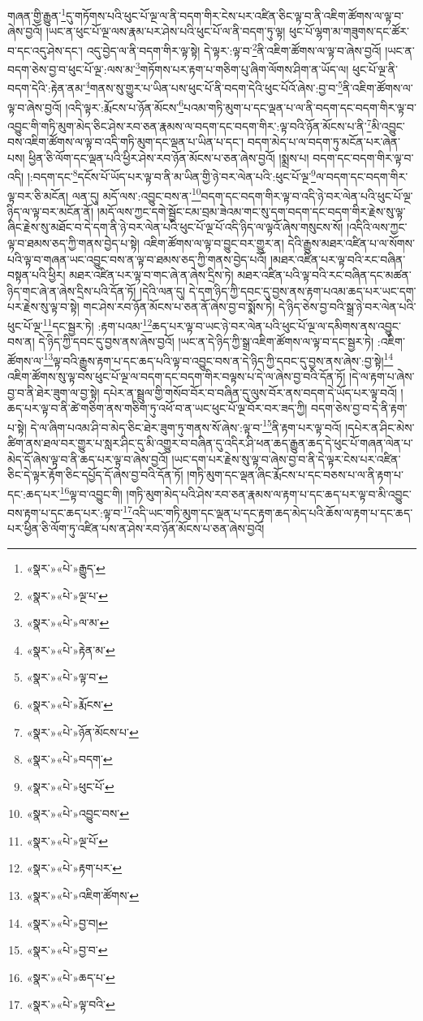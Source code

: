 གཞན་གྱི་རྒྱུན་\footnote{«སྣར་»«པེ་»རྒྱུད་}དུ་གཏོགས་པའི་ཕུང་པོ་ལྔ་ལ་ནི་བདག་གིར་ངེས་པར་འཛིན་ཅིང་ལྟ་བ་ནི་འཇིག་ཚོགས་ལ་ལྟ་བ་ཞེས་བྱའོ། །ཡང་ན་ཕུང་པོ་ལྔ་ལས་རྣམ་པར་ཤེས་པའི་ཕུང་པོ་ལ་ནི་བདག་ཏུ་ལྟ། ཕུང་པོ་ལྷག་མ་གཟུགས་དང་ཚོར་བ་དང་འདུ་ཤེས་དང་། འདུ་བྱེད་ལ་ནི་བདག་གིར་ལྟ་སྟེ། དེ་ལྟར་:ལྟ་བ་\footnote{«སྣར་»«པེ་»ལྔ་པ་}ནི་འཇིག་ཚོགས་ལ་ལྟ་བ་ཞེས་བྱའོ། །ཡང་ན་བདག་ཅེས་བྱ་བ་ཕུང་པོ་ལྔ་:ལས་མ་\footnote{«སྣར་»«པེ་»ལ་མ་}གཏོགས་པར་རྟག་པ་གཅིག་པུ་ཞིག་ལོགས་ཤིག་ན་ཡོད་ལ། ཕུང་པོ་ལྔ་ནི་བདག་དེའི་:རྟེན་ནམ་\footnote{«སྣར་»«པེ་»རྟེན་མ་}གནས་སུ་གྱུར་པ་ཡིན་པས་ཕུང་པོ་ནི་བདག་དེའི་ཕུང་པོའོ་ཞེས་:བྱ་བ་\footnote{«སྣར་»«པེ་»ལྟ་བ་}ནི་འཇིག་ཚོགས་ལ་ལྟ་བ་ཞེས་བྱའོ། །འདི་ལྟར་:རྨོངས་པ་ཉོན་མོངས་\footnote{«སྣར་»«པེ་»རྨོངས་}པའམ་གཏི་མུག་པ་དང་ལྡན་པ་ལ་ནི་བདག་དང་བདག་གིར་ལྟ་བ་འབྱུང་གི་གཏི་མུག་མེད་ཅིང་ཤེས་རབ་ཅན་རྣམས་ལ་བདག་དང་བདག་གིར་:ལྟ་བའི་ཉོན་མོངས་པ་ནི་\footnote{«སྣར་»«པེ་»ཉོན་མོངས་པ་}མི་འབྱུང་བས་འཇིག་ཚོགས་ལ་ལྟ་བ་འདི་གཏི་མུག་དང་ལྡན་པ་ཡིན་པ་དང་། བདག་མེད་པ་ལ་བདག་ཏུ་མངོན་པར་ཞེན་པས། ཕྱིན་ཅི་ལོག་དང་ལྡན་པའི་ཕྱིར་ཤེས་རབ་ཉོན་མོངས་པ་ཅན་ཞེས་བྱའོ། །སྨྲས་པ། བདག་དང་བདག་གིར་ལྟ་བ་འདི། །:བདག་དང་\footnote{«སྣར་»«པེ་»བདག་}དངོས་པོ་ཡོད་པར་ལྟ་བ་ནི་མ་ཡིན་གྱི་ཉེ་བར་ལེན་པའི་:ཕུང་པོ་ལྔ་\footnote{«སྣར་»«པེ་»ཕུང་པོ་}ལ་བདག་དང་བདག་གིར་ལྟ་བར་ཅི་མངོན། ལན་དུ། མདོ་ལས་:འབྱུང་བས་ན་\footnote{«སྣར་»«པེ་»འབྱུང་བས་}བདག་དང་བདག་གིར་ལྟ་བ་འདི་ཉེ་བར་ལེན་པའི་ཕུང་པོ་ལྔ་ཉིད་ལ་ལྟ་བར་མངོན་ནོ། །མདོ་ལས་ཀྱང་དགེ་སྦྱོང་ངམ་བྲམ་ཟེའམ་གང་སུ་དག་བདག་དང་བདག་གིར་རྗེས་སུ་ལྟ་ཞིང་རྗེས་སུ་མཐོང་བ་དེ་དག་ནི་ཉེ་བར་ལེན་པའི་ཕུང་པོ་ལྔ་པོ་འདི་ཉིད་ལ་ལྟའོ་ཞེས་གསུངས་སོ། །འདིའི་ལས་ཀྱང་ལྟ་བ་ཐམས་ཅད་ཀྱི་གནས་བྱེད་པ་སྟེ། འཇིག་ཚོགས་ལ་ལྟ་བ་བྱུང་བར་གྱུར་ན། དེའི་རྒྱུས་མཐར་འཛིན་པ་ལ་སོགས་པའི་ལྟ་བ་གཞན་ཡང་འབྱུང་བས་ན་ལྟ་བ་ཐམས་ཅད་ཀྱི་གནས་བྱེད་པའོ། །མཐར་འཛིན་པར་ལྟ་བའི་རང་བཞིན་བསྟན་པའི་ཕྱིར། མཐར་འཛིན་པར་ལྟ་བ་གང་ཞེ་ན་ཞེས་དྲིས་ཏེ། མཐར་འཛིན་པའི་ལྟ་བའི་རང་བཞིན་དང་མཚན་ཉིད་གང་ཞེ་ན་ཞེས་དྲིས་པའི་དོན་ཏོ། །དེའི་ལན་དུ། དེ་དག་ཉིད་ཀྱི་དབང་དུ་བྱས་ནས་རྟག་པའམ་ཆད་པར་ཡང་དག་པར་རྗེས་སུ་ལྟ་བ་སྟེ། གང་ཤེས་རབ་ཉོན་མོངས་པ་ཅན་ནོ་ཞེས་བྱ་བ་སྨོས་ཏེ། དེ་ཉིད་ཅེས་བྱ་བའི་སྒྲ་ཉེ་བར་ལེན་པའི་ཕུང་པོ་ལྔ་\footnote{«སྣར་»«པེ་»ལྔ་པོ་}དང་སྦྱར་ཏེ། :རྟག་པའམ་\footnote{«སྣར་»«པེ་»རྟག་པར་}ཆད་པར་ལྟ་བ་ཡང་ཉེ་བར་ལེན་པའི་ཕུང་པོ་ལྔ་ལ་དམིགས་ནས་འབྱུང་བས་ན། དེ་ཉིད་ཀྱི་དབང་དུ་བྱས་ནས་ཞེས་བྱའོ། །ཡང་ན་དེ་ཉིད་ཀྱི་སྒྲ་འཇིག་ཚོགས་ལ་ལྟ་བ་དང་སྦྱར་ཏེ། :འཇིག་ཚོགས་ལ་\footnote{«སྣར་»«པེ་»འཇིག་ཚོགས་}ལྟ་བའི་རྒྱུས་རྟག་པ་དང་ཆད་པའི་ལྟ་བ་འབྱུང་བས་ན་དེ་ཉིད་ཀྱི་དབང་དུ་བྱས་ནས་ཞེས་:བྱ་སྟེ།\footnote{«སྣར་»«པེ་»བྱ་བ།} འཇིག་ཚོགས་སུ་ལྟ་བས་ཕུང་པོ་ལྔ་ལ་བདག་དང་བདག་གིར་བལྟས་པ་དེ་ལ་ཞེས་བྱ་བའི་དོན་ཏོ། །དེ་ལ་རྟག་པ་ཞེས་བྱ་བ་ནི་ཐེར་ཟུག་ལ་བྱ་སྟེ། དཔེར་ན་སྦྲུལ་གྱི་གསོབ་བོར་བ་བཞིན་དུ་ལུས་བོར་ནས་བདག་དེ་ཡོད་པར་ལྟ་བའོ། །ཆད་པར་ལྟ་བ་ནི་ཚེ་གཅིག་ནས་གཅིག་ཏུ་འཕོ་བ་ན་ཡང་ཕུང་པོ་ལྔ་བོར་བར་ཟད་ཀྱི། བདག་ཅེས་བྱ་བ་དེ་ནི་རྟག་པ་སྟེ། དེ་ལ་ཞིག་པའམ་ཤི་བ་མེད་ཅིང་ཐེར་ཟུག་ཏུ་གནས་སོ་ཞེས་:ལྟ་བ་\footnote{«སྣར་»«པེ་»བྱ་བ་}ནི་རྟག་པར་ལྟ་བའོ། །དཔེར་ན་ཤིང་མེས་ཚིག་ནས་ཐལ་བར་གྱུར་པ་སླར་ཤིང་དུ་མི་འགྱུར་བ་བཞིན་དུ་འདིར་ཤི་ཕན་ཆད་རྒྱུན་ཆད་དེ་ཕུང་པོ་གཞན་ལེན་པ་མེད་དོ་ཞེས་ལྟ་བ་ནི་ཆད་པར་ལྟ་བ་ཞེས་བྱའོ། །ཡང་དག་པར་རྗེས་སུ་ལྟ་བ་ཞེས་བྱ་བ་ནི་དེ་ལྟར་ངེས་པར་འཛིན་ཅིང་དེ་ལྟར་རྟོག་ཅིང་དཔྱོད་དོ་ཞེས་བྱ་བའི་དོན་ཏོ། །གཏི་མུག་དང་ལྡན་ཞིང་རྨོངས་པ་དང་བཅས་པ་ལ་ནི་རྟག་པ་དང་:ཆད་པར་\footnote{«སྣར་»«པེ་»ཆད་པ་}ལྟ་བ་འབྱུང་གི། །གཏི་མུག་མེད་པའི་ཤེས་རབ་ཅན་རྣམས་ལ་རྟག་པ་དང་ཆད་པར་ལྟ་བ་མི་འབྱུང་བས་རྟག་པ་དང་ཆད་པར་:ལྟ་བ་\footnote{«སྣར་»«པེ་»ལྟ་བའི་}འདི་ཡང་གཏི་མུག་དང་ལྡན་པ་དང་རྟག་ཆད་མེད་པའི་ཆོས་ལ་རྟག་པ་དང་ཆད་པར་ཕྱིན་ཅི་ལོག་ཏུ་འཛིན་པས་ན་ཤེས་རབ་ཉོན་མོངས་པ་ཅན་ཞེས་བྱའོ། 